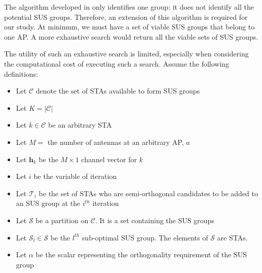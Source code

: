 The algorithm developed in \cite{1603708} only identifies one group: it does not identify all the potential SUS groups. Therefore, an extension of this algorithm is required for our study. At minimum, we must have a set of viable SUS groups that belong to one AP. A more exhaustive search would return all the viable sets of SUS groups. 

The utility of such an exhaustive search is limited, especially when considering the computational cost of executing such a search.
Assume the following definitions:
\begin{itemize}
    \item Let $\mathcal{C}$ denote the set of STAs available to form SUS groups
    \item Let $K = \vert \mathcal{C} \vert $
    \item Let $k \in \mathcal{C}$ be an arbitrary STA
    \item Let $M = $ the number of antennas at an arbitrary AP, $a$
    \item Let $\textbf{h}_k$ be the $M \times 1$ channel vector for $k$
    \item Let $i$ be the variable of iteration
    \item Let $\mathcal{T}_i$ be the set of STAs who are semi-orthogonal candidates to be added to an SUS group at the $i^{th}$ iteration
    \item Let $\mathscr{S}$ be a partition on $\mathcal{C}$. It is a set containing the SUS groups
    \item Let $\mathcal{S}_l \in \mathscr{S}$ be the $l^{th}$ sub-optimal SUS group. The elements of $\mathcal{S}$ are STAs.
    \item Let $\alpha$ be the scalar representing the orthogonality requirement of the SUS group
\end{itemize}


